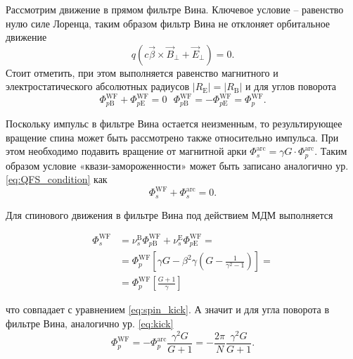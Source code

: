 \par Рассмотрим движение в прямом фильтре Вина. Ключевое условие -- равенство нулю силе Лоренца, таким образом фильтр Вина не отклоняет орбитальное движение
\begin{equation}
q\left(c\vec{\beta}\times{\vec{B}}_\bot+{\vec{E}}_\bot\right)=0.
\end{equation}
\noindent Стоит отметить, при этом выполняется равенство магнитного и электростатического абсолютных радиусов $\left|R_{\textrm{E}}\right|=\left|R_{\textrm{B}}\right|$ и для углов поворота
\begin{equation}
\Phi_{p\textrm{B}}^{\textrm{WF}}+\Phi_{p\textrm{E}}^{\textrm{WF}}=0\ \ \ 
\Phi_{p\textrm{B}}^{\textrm{WF}}=-\Phi_{p\textrm{E}}^{\textrm{WF}}=\Phi_p^{\textrm{WF}}.
\end{equation}

\noindent Поскольку импульс в фильтре Вина остается неизменным, то результирующее вращение спина может быть рассмотрено также относительно импульса. При этом необходимо подавить вращение от магнитной арки $\Phi_s^{\textrm{arc}}=\gamma G\cdot\Phi_p^{\textrm{arc}}$.
Таким образом условие «квази-замороженности» может быть записано аналогично ур. \ref{eq:QFS_condition} как 
\begin{equation}
\Phi_s^{\textrm{WF}}+\Phi_s^{\textrm{arc}}=0.
\end{equation}

\noindent Для спинового движения в фильтре Вина под действием МДМ выполняется

\begin{equation} \label{eq:spin_kick_WF}
\begin{aligned}
 \Phi_s^{\textrm{WF}} & =  \nu_s^{\textrm{B}} \Phi_{p\textrm{B}}^{\textrm{WF}}+\nu_s^{\textrm{E}} \Phi_{p\textrm{E}}^{\textrm{WF}}= \\
			& =  \Phi_p^{\textrm{WF}}\left[\gamma G-\beta^2 \gamma\left(G-\frac{1}{\gamma^2-1}\right)\right]= \\
			& =  \Phi_p^{\textrm{WF}}\left[\frac{G+1}{\gamma}\right]
\end{aligned}
\end{equation}

\noindent что совпадает с уравнением \ref{eq:spin_kick}. А значит и для угла поворота в фильтре Вина, аналогично ур. \ref{eq:kick}
\begin{equation}
\Phi_p^{\textrm{WF}}=-\Phi_p^{\textrm{arc}}\frac{\gamma^2G}{G+1}=-\frac{2\pi}{N}\frac{\gamma^2G}{G+1}.
\end{equation}

